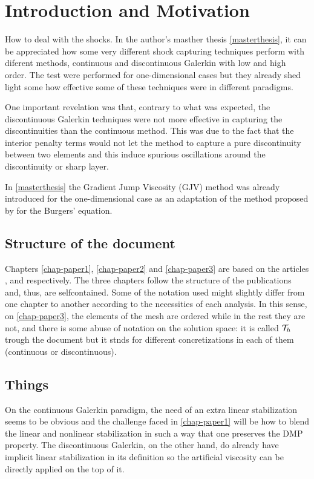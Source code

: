 \chapter{Introduction and Motivation}
\label{chap-intro}


How to deal with the shocks. In the {author's} masther thesis \ref{masterthesis}, it can be appreciated how some very different shock capturing techniques perform with diferent methods, continuous and discontinuous Galerkin with low and high order. The test were performed for one-dimensional cases but they already shed light some how effective some of these techniques were in different paradigms.

One important revelation was that, contrary to what was expected, the discontinuous Galerkin techniques were not more effective in capturing the discontinuities than the continuous method. This was due to the fact that the interior penalty terms would not let the method to capture a pure discontinuity between two elements and this induce spurious oscillations around the discontinuity or sharp layer.

In \ref{masterthesis} the Gradient Jump Viscosity (GJV) method was already introduced for the one-dimensional case as an adaptation of the method proposed by \cite{burman_nonlinear_2007} for the Burgers' equation.

\section{Structure of the document}
Chapters \ref{chap-paper1}, \ref{chap-paper2} and \ref{chap-paper3} are based on the  articles \cite{badia_stabilized_2012}, \cite{badia_discrete_2015} and \cite{paper3} respectively. The three chapters follow the structure of the publications and, thus, are selfcontained. Some of the notation used might slightly differ from one chapter to another according to the necessities of each analysis. In this sense, on \ref{chap-paper3}, the elements of the mesh are ordered while in the rest they are not, and there is some abuse of notation on the solution space: it is called $\mathcal{T}_h$ trough the document but it stnds for different concretizations in each of them (continuous or discontinuous). 

\section{Things}
On the continuous Galerkin paradigm, the need of an extra linear stabilization seems to be obvious and the challenge faced in \ref{chap-paper1} will be how to blend the linear and nonlinear stabilization in such a way that one preserves the DMP property. The discontinuous Galerkin, on the other hand, do already have implicit linear stabilization in its definition so the artificial viscosity can be directly applied on the top of it.

